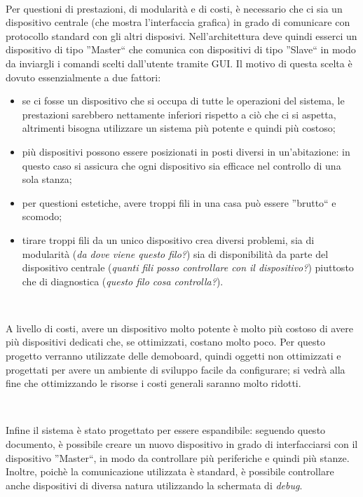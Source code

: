 \documentclass[a4paper,titlepage]{book}
\begin{document}
~

Per questioni di prestazioni, di modularità e di costi, è necessario che ci sia un dispositivo centrale (che mostra l'interfaccia grafica) in grado di comunicare con protocollo standard con gli altri disposivi. Nell'architettura deve quindi esserci un dispositivo di tipo ''Master`` che comunica con dispositivi di tipo ''Slave`` in modo da inviargli i comandi scelti dall'utente tramite GUI. Il motivo di questa scelta è dovuto essenzialmente a due fattori:

\begin{itemize}[noitemsep,topsep=10pt,parsep=23pt,partopsep=0pt]
\item se ci fosse un dispositivo che si occupa di tutte le operazioni del sistema, le prestazioni sarebbero nettamente inferiori rispetto a ciò che ci si aspetta, altrimenti bisogna utilizzare un sistema più potente e quindi più costoso;

\item più dispositivi possono essere posizionati in posti diversi in un'abitazione: in questo caso si assicura che ogni dispositivo sia efficace nel controllo di una sola stanza;

\item per questioni estetiche, avere troppi fili in una casa può essere ''brutto`` e scomodo;

\item tirare troppi fili da un unico dispositivo crea diversi problemi, sia di modularità (\textit{da dove viene questo filo?}) sia di disponibilità da parte del dispositivo centrale (\textit{quanti fili posso controllare con il dispositivo?}) piuttosto che di diagnostica (\textit{questo filo cosa controlla?}).


\end{itemize}

~

A livello di costi, avere un dispositivo molto potente è molto più costoso di avere più dispositivi dedicati che, se ottimizzati, costano molto poco.
Per questo progetto verranno utilizzate delle demoboard, quindi oggetti non ottimizzati e progettati per avere un ambiente di sviluppo facile da configurare; si vedrà alla fine che ottimizzando le risorse i costi generali saranno molto ridotti.

~

Infine il sistema è stato progettato per essere espandibile: seguendo questo documento, è possibile creare un nuovo dispositivo in grado di interfacciarsi con il dispositivo ''Master``, in modo da controllare più periferiche e quindi più stanze. Inoltre, poichè la comunicazione utilizzata è standard, è possibile controllare anche dispositivi di diversa natura utilizzando la schermata di \textit{debug}.
\end{document}
